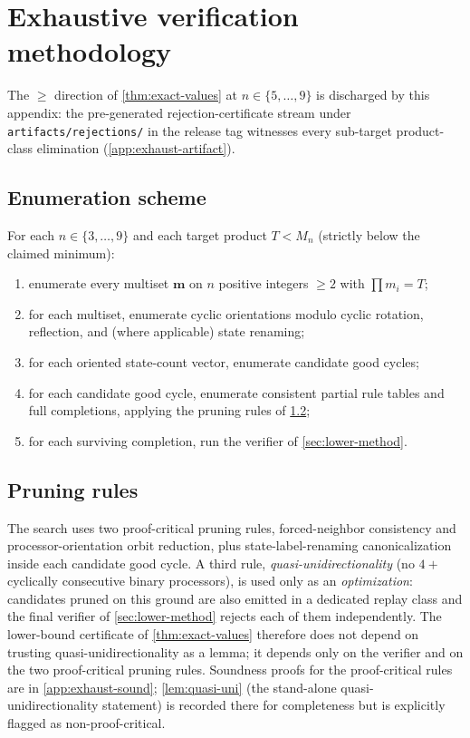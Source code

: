 \documentclass[11pt,a4paper]{article}
\theoremstyle{plain}
\theoremstyle{definition}
\newcommand{\Mn}{M_n}
\begin{document}
\section{Exhaustive verification methodology}\label{app:exhaust}

The $\ge$ direction of \cref{thm:exact-values} at $n \in \{5,
\ldots, 9\}$ is discharged by this appendix: the pre-generated
rejection-certificate stream under \texttt{artifacts/rejections/}
in the release tag witnesses every sub-target product-class
elimination (\cref{app:exhaust-artifact}).

\subsection{Enumeration scheme}\label{app:exhaust-enum}

For each $n \in \{3, \ldots, 9\}$ and each target product
$T < \Mn$ (strictly below the claimed minimum):
\begin{enumerate}[leftmargin=*]
\item enumerate every multiset $\mathbf{m}$ on $n$ positive integers
$\ge 2$ with $\prod m_i = T$;
\item for each multiset, enumerate cyclic orientations modulo cyclic
rotation, reflection, and (where applicable) state renaming;
\item for each oriented state-count vector, enumerate candidate good
cycles;
\item for each candidate good cycle, enumerate consistent partial rule
tables and full completions, applying the pruning rules of
\cref{app:exhaust-pruning};
\item for each surviving completion, run the verifier of
\cref{sec:lower-method}.
\end{enumerate}

\subsection{Pruning rules}\label{app:exhaust-pruning}

The search uses two proof-critical pruning rules, forced-neighbor
consistency and processor-orientation orbit reduction, plus
state-label-renaming canonicalization inside each candidate good
cycle.  A third rule, \emph{quasi-unidirectionality} (no $4+$
cyclically consecutive binary processors), is used only as an
\emph{optimization}: candidates pruned on this ground are also
emitted in a dedicated replay class and the final verifier of
\cref{sec:lower-method} rejects each of them independently.  The
lower-bound certificate of
\cref{thm:exact-values} therefore does not
depend on trusting quasi-unidirectionality as a lemma; it depends
only on the verifier and on the two proof-critical pruning rules.
Soundness proofs for the proof-critical rules are in
\cref{app:exhaust-sound}; \cref{lem:quasi-uni} (the stand-alone
quasi-unidirectionality statement) is recorded there for completeness
but is explicitly flagged as non-proof-critical.
\end{document}
